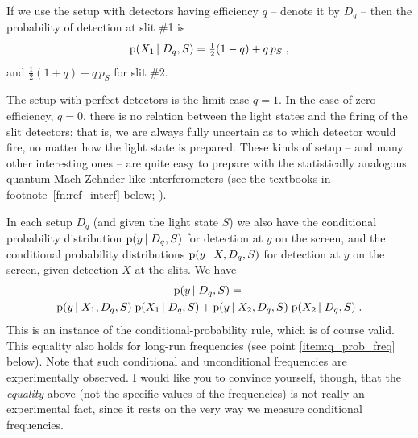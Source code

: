 \documentclass[\ifafour a4paper,12pt,\else a5paper,10pt,\fi%
onecolumn,oneside,article,%
british%
]{memoir}
\theoremstyle{remark}
\theoremstyle{innote}
\newcommand*{\pf}{\mathrm{p}}%
\renewcommand*{\|}[1][]{\nonscript\,#1\vert\nonscript\;\mathopen{}}
\newcommand*{\sect}{\S}%
\newcommand*{\yxa}{X_{1}}
\newcommand*{\yxb}{X_{2}}
\newcommand*{\yDq}{D_{q}}
\begin{document}
If we use the setup with detectors having efficiency $q$ -- denote it by
$\yDq$ -- then the probability of detection at slit \#1 is
\begin{equation}
  \label{eq:explain_noisy}
  \pf(\yxa \| \yDq, S) =  \tfrac{1}{2} (1-q) + q\,p_{S}\;,
\end{equation}
and $\tfrac{1}{2}(1+q) - q\,p_{S}$ for slit \#2.

The setup with perfect detectors is the limit case $q=1$. In the case of
zero efficiency, $q=0$, there is no relation between the light states and
the firing of the slit detectors; that is, we are always fully uncertain as
to which detector would fire, no matter how the light state is prepared.
These kinds of setup -- and many other interesting ones -- are quite easy
to prepare with the statistically analogous quantum Mach-Zehnder-like
interferometers (see the textbooks in footnote~\ref{fn:ref_interf} below;
\cites[\sect~4.2]{leonhardt1997}{yuenetal1978}).
  
In each setup $\yDq$ (and given the light state $S$) we also have the
conditional probability distribution $\pf(y \| \yDq,S)$ for detection at
$y$ on the screen, and the conditional probability distributions
$\pf(y \| X,\yDq,S)$ for detection at $y$ on the screen, given detection
$X$ at the slits. We have
\begin{multline}
  \label{eq:conditional_q}
  \pf(y \| \yDq, S) ={}\\
  \pf(y \| \yxa, \yDq, S) \;\pf( \yxa \| \yDq, S) +
  \pf(y \| \yxb, \yDq, S) \;\pf( \yxb \| \yDq, S) \;.
\end{multline}
This is an instance of the conditional-probability rule, which is of course
valid. This equality also holds for long-run frequencies (see point
\ref{item:q_prob_freq} below). Note that such conditional and unconditional
frequencies are experimentally observed. I would like you to convince
yourself, though, that the \emph{equality} above (not the specific values
of the frequencies) is not really an experimental fact, since it rests on
the very way we measure conditional frequencies.
\end{document}
